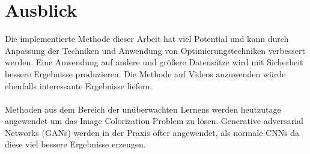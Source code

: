\section{Ausblick}
Die implementierte Methode dieser Arbeit hat viel Potential und kann durch Anpassung der Techniken und Anwendung von Optimierungstechniken
verbessert werden. Eine Anwendung auf andere und größere Datensätze wird mit Sicherheit bessere Ergebnisse produzieren. Die Methode auf Videos
anzuwenden würde ebenfalls interessante Ergebnisse liefern.
\\
\\
Methoden aus dem Bereich der unüberwachten Lernens werden heutzutage angewendet um das Image Colorization Problem zu lösen. Generative adversarial
Networks (GANs) werden in der Praxis öfter angewendet, als normale \gls{CNN}s da diese viel bessere Ergebnisse erzeugen.